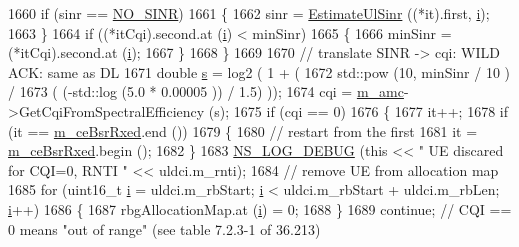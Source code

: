 \begin{DoxyCode}
1660               \textcolor{keywordflow}{if} (sinr == \hyperlink{cqa-ff-mac-scheduler_8h_a520d71777be043568160c783a9c65fd5}{NO\_SINR})
1661                 \{
1662                   sinr = \hyperlink{classns3_1_1FdMtFfMacScheduler_a122203c0bde6e999628485d24dee6e5e}{EstimateUlSinr} ((*it).first, \hyperlink{bernuolliDistribution_8m_a6f6ccfcf58b31cb6412107d9d5281426}{i});
1663                 \}
1664               \textcolor{keywordflow}{if} ((*itCqi).second.at (\hyperlink{bernuolliDistribution_8m_a6f6ccfcf58b31cb6412107d9d5281426}{i}) < minSinr)
1665                 \{
1666                   minSinr = (*itCqi).second.at (\hyperlink{bernuolliDistribution_8m_a6f6ccfcf58b31cb6412107d9d5281426}{i});
1667                 \}
1668             \}
1669 
1670           \textcolor{comment}{// translate SINR -> cqi: WILD ACK: same as DL}
1671           \textcolor{keywordtype}{double} \hyperlink{generate__test__data__lte__sinr_8m_ad83eeb3a142285d1243a08c6b7026df8}{s} = log2 ( 1 + (
1672                                  std::pow (10, minSinr / 10 )  /
1673                                  ( (-std::log (5.0 * 0.00005 )) / 1.5) ));
1674           cqi = \hyperlink{classns3_1_1FdMtFfMacScheduler_a243eae6fea006597039d90bc727786eb}{m\_amc}->GetCqiFromSpectralEfficiency (s);
1675           \textcolor{keywordflow}{if} (cqi == 0)
1676             \{
1677               it++;
1678               \textcolor{keywordflow}{if} (it == \hyperlink{classns3_1_1FdMtFfMacScheduler_a10a21cad9af4c783734123f38e697316}{m\_ceBsrRxed}.end ())
1679                 \{
1680                   \textcolor{comment}{// restart from the first}
1681                   it = \hyperlink{classns3_1_1FdMtFfMacScheduler_a10a21cad9af4c783734123f38e697316}{m\_ceBsrRxed}.begin ();
1682                 \}
1683               \hyperlink{group__logging_ga413f1886406d49f59a6a0a89b77b4d0a}{NS\_LOG\_DEBUG} (\textcolor{keyword}{this} << \textcolor{stringliteral}{" UE discared for CQI=0, RNTI "} << uldci.m\_rnti);
1684               \textcolor{comment}{// remove UE from allocation map}
1685               \textcolor{keywordflow}{for} (uint16\_t \hyperlink{bernuolliDistribution_8m_a6f6ccfcf58b31cb6412107d9d5281426}{i} = uldci.m\_rbStart; \hyperlink{bernuolliDistribution_8m_a6f6ccfcf58b31cb6412107d9d5281426}{i} < uldci.m\_rbStart + uldci.m\_rbLen; 
      \hyperlink{bernuolliDistribution_8m_a6f6ccfcf58b31cb6412107d9d5281426}{i}++)
1686                 \{
1687                   rbgAllocationMap.at (\hyperlink{bernuolliDistribution_8m_a6f6ccfcf58b31cb6412107d9d5281426}{i}) = 0;
1688                 \}
1689               \textcolor{keywordflow}{continue}; \textcolor{comment}{// CQI == 0 means "out of range" (see table 7.2.3-1 of 36.213)}

\end{DoxyCode}
